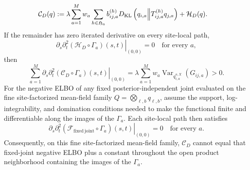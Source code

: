 \begin{align}
\mathcal C_D(q)
:={}&\lambda\sum_{a=1}^{M}w_a
\sum_{h\in\mathfrak H_a}b_{ij,a}^{(h)}
D_{\mathrm{KL}}\left(q_{i,a}\middle\Vert T_{ij,a}^{(h)}q_{j,a}\right)
+\mathcal H_D(q).
\label{eq:moving-peer-finite-functional}
\end{align}
If the remainder has zero iterated derivative on every site-local path,
\begin{equation}
\left.\partial_s\partial_t^2
(\mathcal H_D\circ\Gamma_a)(s,t)\right|_{(0,0)}=0
\quad\text{for every \(a\)},
\label{eq:moving-peer-remainder-no-cancellation}
\end{equation}
then
\begin{equation}
\sum_{a=1}^{M}
\left.\partial_s\partial_t^2
(\mathcal C_D\circ\Gamma_a)(s,t)\right|_{(0,0)}
=\lambda\sum_{a=1}^{M}w_a
\operatorname{Var}_{q_{i,a}^{o,X}}(G_{ij,a})>0.
\label{eq:moving-peer-mixed-third}
\end{equation}
For the negative ELBO of any fixed posterior-independent joint evaluated on the fine site-factorized mean-field family \(Q=\bigotimes_{\ell,b}q_{\ell,b}\), assume the support, log-integrability, and domination conditions needed to make the functional finite and differentiable along the images of the \(\Gamma_a\). Each site-local path then satisfies
\begin{equation}
\left.\partial_s\partial_t^2
(\mathcal F_{\mathrm{fixed\ joint}}\circ\Gamma_a)(s,t)
\right|_{(0,0)}=0
\quad\text{for every \(a\)}.
\label{eq:fixed-joint-mixed-third-zero}
\end{equation}
Consequently, on this fine site-factorized mean-field family, \(\mathcal C_D\) cannot equal that fixed-joint negative ELBO plus a constant throughout the open product neighborhood containing the images of the \(\Gamma_a\).

